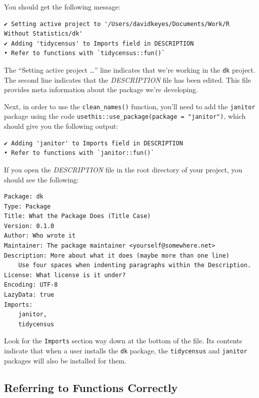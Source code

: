 \documentclass[
]{book}
\begin{document}
You should get the following message:

\begin{verbatim}
✔ Setting active project to '/Users/davidkeyes/Documents/Work/R Without Statistics/dk'
✔ Adding 'tidycensus' to Imports field in DESCRIPTION
• Refer to functions with `tidycensus::fun()`
\end{verbatim}

The ``Setting active project \ldots{}'' line indicates that we're working in the \texttt{dk} project. The second line indicates that the \emph{DESCRIPTION} file has been edited. This file provides meta information about the package we're developing.

Next, in order to use the \texttt{clean\_names()} function, you'll need to add the \texttt{janitor} package using the code \texttt{usethis::use\_package(package\ =\ "janitor")}, which should give you the following output:

\begin{verbatim}
✔ Adding 'janitor' to Imports field in DESCRIPTION
• Refer to functions with `janitor::fun()`
\end{verbatim}

If you open the \emph{DESCRIPTION} file in the root directory of your project, you should see the following:

\begin{verbatim}
Package: dk
Type: Package
Title: What the Package Does (Title Case)
Version: 0.1.0
Author: Who wrote it
Maintainer: The package maintainer <yourself@somewhere.net>
Description: More about what it does (maybe more than one line)
    Use four spaces when indenting paragraphs within the Description.
License: What license is it under?
Encoding: UTF-8
LazyData: true
Imports: 
    janitor,
    tidycensus
\end{verbatim}

Look for the \texttt{Imports} section way down at the bottom of the file. Its contents indicate that when a user installs the \texttt{dk} package, the \texttt{tidycensus} and \texttt{janitor} packages will also be installed for them.

\hypertarget{referring-to-functions-correctly}{%
\subsection*{Referring to Functions Correctly}\label{referring-to-functions-correctly}}
\end{document}
